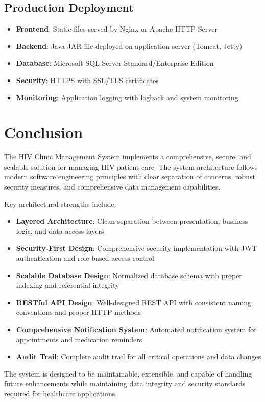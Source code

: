 \documentclass[12pt,a4paper]{article}
\begin{document}
\subsection{Production Deployment}

\begin{itemize}
\item \textbf{Frontend}: Static files served by Nginx or Apache HTTP Server
\item \textbf{Backend}: Java JAR file deployed on application server (Tomcat, Jetty)
\item \textbf{Database}: Microsoft SQL Server Standard/Enterprise Edition
\item \textbf{Security}: HTTPS with SSL/TLS certificates
\item \textbf{Monitoring}: Application logging with logback and system monitoring
\end{itemize}

\section{Conclusion}

The HIV Clinic Management System implements a comprehensive, secure, and scalable solution for managing HIV patient care. The system architecture follows modern software engineering principles with clear separation of concerns, robust security measures, and comprehensive data management capabilities.

Key architectural strengths include:
\begin{itemize}
\item \textbf{Layered Architecture}: Clean separation between presentation, business logic, and data access layers
\item \textbf{Security-First Design}: Comprehensive security implementation with JWT authentication and role-based access control
\item \textbf{Scalable Database Design}: Normalized database schema with proper indexing and referential integrity
\item \textbf{RESTful API Design}: Well-designed REST API with consistent naming conventions and proper HTTP methods
\item \textbf{Comprehensive Notification System}: Automated notification system for appointments and medication reminders
\item \textbf{Audit Trail}: Complete audit trail for all critical operations and data changes
\end{itemize}

The system is designed to be maintainable, extensible, and capable of handling future enhancements while maintaining data integrity and security standards required for healthcare applications.
\end{document}
